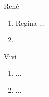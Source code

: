 
René
\begin{enumerate}
	\item Regina ...
	\item 
\end{enumerate}

Vivi
\begin{enumerate}
	\item ...
	\item ...
\end{enumerate}